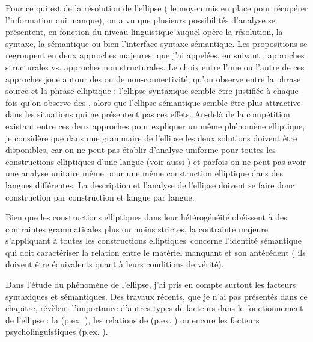 Pour ce qui est de la résolution de l’ellipse ({\cad} le moyen mis en place pour récupérer l’information qui manque), on a vu que plusieurs possibilités d’analyse se présentent, en fonction du niveau linguistique auquel opère la résolution, {\cad} la syntaxe, la sémantique ou bien l’interface syntaxe-sémantique. Les propositions se regroupent en deux approches majeures, que j’ai appelées, en suivant \citet{Merchant2009}, approches structurales vs. approches non structurales. Le choix entre l’une ou l’autre de ces approches joue autour des  ou de non-connectivité, qu’on observe entre la phrase source et la phrase elliptique : l’ellipse syntaxique semble être justifiée à chaque fois qu’on observe des , alors que l’ellipse sémantique semble être plus attractive dans les situations qui ne présentent pas ces effets. Au-delà de la compétition existant entre ces deux approches pour expliquer un même phénomène elliptique, je considère que dans une grammaire de l’ellipse les deux solutions doivent être disponibles, car on ne peut pas établir d’analyse uniforme pour toutes les constructions elliptiques d’une langue (voir aussi \citealt{GinzburgEtAlToAppear}) et parfois on ne peut pas avoir une analyse unitaire même pour une même construction elliptique dans des langues différentes. La description et l’analyse de l’ellipse doivent se faire donc construction par construction et langue par langue.

Bien que les constructions elliptiques dans leur hétérogénéité obéissent à des contraintes grammaticales plus ou moins strictes, la contrainte majeure s’appli\-quant à toutes les constructions elliptiques~concerne l’identité sémantique qui doit caractériser la relation entre le matériel manquant et son antécédent ({\cad} ils doivent être équivalents quant à leurs conditions de vérité). 

Dans l’étude du phénomène de l’ellipse, j’ai pris en compte surtout les facteurs syntaxiques et sémantiques. Des travaux récents, que je n’ai pas présentés dans ce chapitre, révèlent l’importance d’autres types de facteurs dans le fonctionnement de l’ellipse : la  (p.ex. \citealt{Winkler2005,Kertz2010,Kertz2013}), les relations de  (p.ex. \citealt{Kehler1994,Kehler2000,Kehler2002}) ou encore les facteurs psycholinguistiques (p.ex. \citealt{Carlson2001,Carlson2002,CarlsonEtAl2005,MartinEtAl2009,MartinEtAl2011,YoshidaEtAl2012}). 


